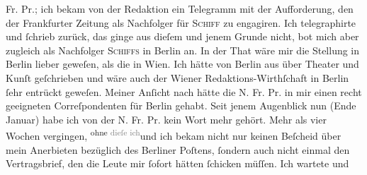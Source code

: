 \begin{ledgroupsized}[t]{13cm}
                  Fr. Pr.; ich bekam von der Redaktion ein Telegramm mit der Aufforderung, den \label{K_L02868-123v}\label{K_L02868-123h} der Frankfurter Zeitung als Nachfolger für \textsc{Schiff} zu engagiren. {\pb}Ich telegraphirte \introOben{}und ſchrieb\introOben{} zurück, das ginge aus dieſem und jenem Grunde
               nicht, bot mich aber zugleich als Nachfolger \textsc{Schiffs} in Berlin an. In der That wäre mir die Stellung in Berlin lieber geweſen,  als die in Wien. Ich hätte von
                  Berlin aus über Theater und Kunſt geſchrieben
               und wäre auch der Wiener Redaktions-Wirthſchaft in
                  Berlin ſehr  entrückt geweſen. Meiner Anſicht nach hätte
               die N. Fr. Pr. in mir einen recht geeigneten
               Correſpondenten für Berlin gehabt. Seit jenem
               Augenblick nun (Ende Januar) habe ich  von der N. Fr.
                  Pr. kein Wort mehr gehört. Mehr als vier Wochen vergingen, \substVorne{}\textsuperscript{ohne{ }\textcolor{gray}{dieſe ich}}{\allowbreak}\substDazwischen{}und ich bekam\substHinten{} nicht nur keinen Beſcheid über mein Anerbieten bezüglich des Berliner Poſtens, ſondern auch nicht einmal den
               Vertragsbrief, den die Leute mir ſofort hätten ſchicken müſſen. Ich wartete und

\end{ledgroupsized}
